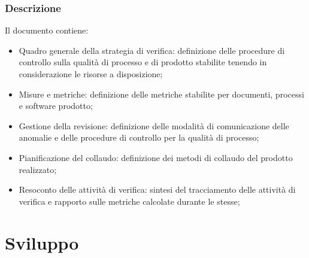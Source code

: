 \documentclass[./../NomeDocumento.tex]{subfiles}
\begin{document}
\subsubsection{Descrizione}
Il documento contiene:

\begin{itemize}
    \item{Quadro generale della strategia di verifica:} definizione delle procedure di controllo sulla qualità di processo e di prodotto stabilite tenendo in considerazione le risorse a disposizione;
    
    \item{Misure e metriche:} definizione delle metriche stabilite per documenti, processi e software prodotto;
    
    \item{Gestione della revisione:} definizione delle modalità di comunicazione delle anomalie e delle procedure di controllo per la qualità di processo;
    
    \item{Pianificazione del collaudo:} definizione dei metodi di collaudo del prodotto realizzato;
    
    \item{Resoconto delle attività di verifica:} sintesi del tracciamento delle attività di verifica e rapporto sulle metriche calcolate durante le stesse;
\end{itemize}


\section{Sviluppo}
\end{document}
